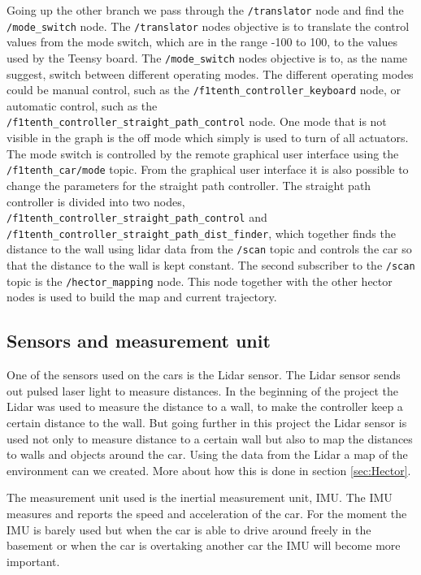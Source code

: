 \documentclass{LTHtwocol} %
\begin{document}
Going up the other branch we pass through the \texttt{/translator} node and find the \texttt{/mode\_switch} node. The \texttt{/translator} nodes objective is to translate the control values from the mode switch, which are in the range -100 to 100, to the values used by the Teensy board. The \texttt{/mode\_switch} nodes objective is to, as the name suggest, switch between different operating modes. The different operating modes could be manual control, such as the \texttt{/f1tenth\_controller\_keyboard} node, or automatic control, such as the \\ \texttt{/f1tenth\_controller\_straight\_path\_control} node. One mode that is not visible in the graph is the off mode which simply is used to turn of all actuators. The mode switch is controlled by the remote graphical user interface using the \texttt{/f1tenth\_car/mode} topic. From the graphical user interface it is also possible to change the parameters for the straight path controller. The straight path controller is divided into two nodes, \texttt{/f1tenth\_controller\_straight\_path\_control} and \texttt{/f1tenth\_controller\_straight\_path\_dist\_finder}, which together finds the distance to the wall using lidar data from the \texttt{/scan} topic and controls the car so that the distance to the wall is kept constant. The second subscriber to the \texttt{/scan} topic is the \texttt{/hector\_mapping} node. This node together with the other hector nodes is used to build the map and current trajectory.

\subsection{Sensors and measurement unit}
One of the sensors used on the cars is the Lidar sensor. The Lidar sensor sends out pulsed laser light to measure distances. In the beginning of the project the Lidar was used to measure the distance to a wall, to make the controller keep a certain distance to the wall. But going further in this project the Lidar sensor is used not only to measure distance to a certain wall but also to map the distances to walls and objects around the car. Using the data from the Lidar a map of the environment can we created. More about how this is done in section \ref{sec:Hector}.


The measurement unit used is the inertial measurement unit, IMU. The IMU measures and reports the speed and acceleration of the car. For the moment the IMU is barely used but when the car is able to drive around freely in the basement or when the car is overtaking another car the IMU will become more important.
\end{document}
